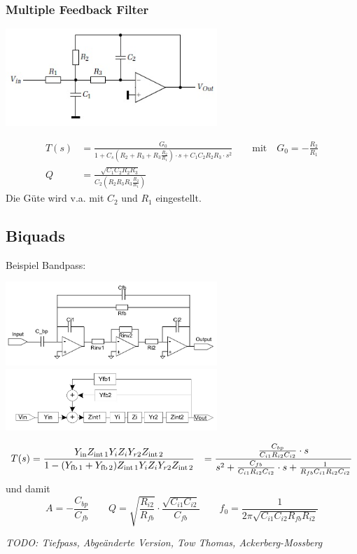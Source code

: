 \subsubsection{Multiple Feedback Filter}
\begin{center}
	\includegraphics[width=8cm]{images/filter_mfb.jpg}
\end{center}
\begin{align*}
	T(s) &= \frac{G_0}{1 + C_s \left(R_2 + R_3 + R_3 \frac{R_2}{R_1}\right) \cdot s + C_1 C_2 R_2 R_3 \cdot s^2} \qquad \text{mit} \quad G_0 = -\frac{R_2}{R_1} \\
	Q &= \frac{\sqrt{C_1 C_2 R_2 R_3}}{C_2 \left(R_2 R_3 R_3 \frac{R_2}{R_1}\right)}
\end{align*}
Die Güte wird v.a. mit $C_2$ und $R_1$ eingestellt.


\subsection{Biquads}
Beispiel Bandpass:
\begin{center}
	\includegraphics[width=8cm]{images/filter_biquad.jpg} 
	\hspace{2cm}
	\includegraphics[width=8cm]{images/filter_biquad_block.jpg} 
\end{center}
\begin{align*}
	T(s) &= \frac{Y_{\operatorname{\text{in}}} Z_{\operatorname{\text{int}} 1} Y_i Z_i Y_{r 2} Z_{\operatorname{\text{int}} 2}}{1 - (Y_{\operatorname{\text{fb}} 1}+Y_{\operatorname{\text{fb}} 2}) Z_{\operatorname{\text{int}} 1} Y_i Z_i Y_{r 2} Z_{\operatorname{\text{int}} 2}}
	&= \frac{\frac{C_{bp}}{C_{i1} R_{i2} C_{i2}} \cdot s}{s^2 + \frac{C_{fb}}{C_{i1} R_{i2} C_{i2}} \cdot s + \frac{1}{R_{fb} C_{i1} R_{i2} C_{i2}}}
\end{align*}
und damit
\begin{equation*}
	A = -\frac{C_{bp}}{C_{fb}} \qquad Q = \sqrt{\frac{R_{i2}}{R_{fb}}} \cdot \frac{\sqrt{C_{i1} C_{i2}}}{C_{fb}} \qquad f_0 = \frac{1}{2 \pi \sqrt{C_{i1} C_{i2} R_{fb} R_{i2}}}
\end{equation*}

\emph{TODO: Tiefpass, Abgeänderte Version, Tow Thomas, Ackerberg-Mossberg}